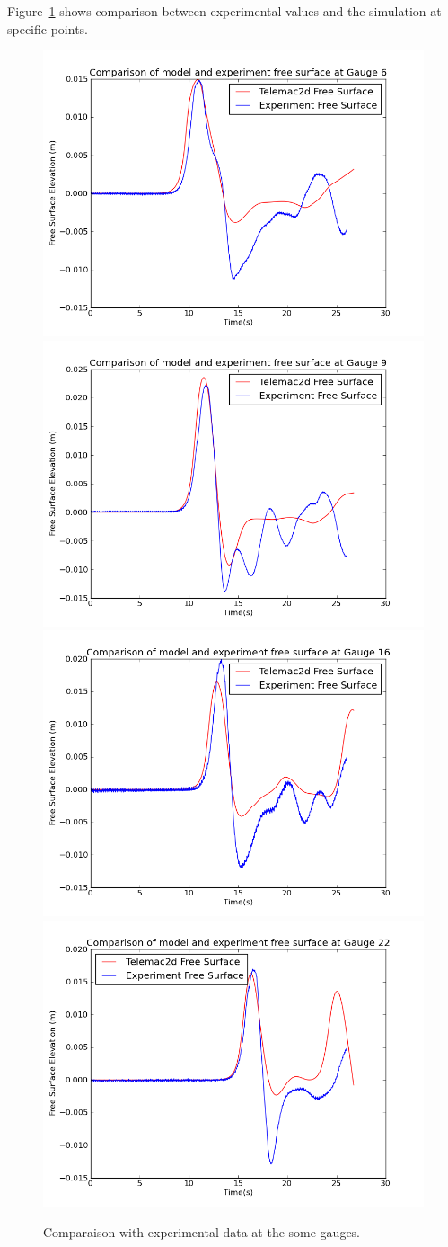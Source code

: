 Figure~\ref{fig:island:res} shows comparison between experimental values and
the simulation at specific points.
\begin{figure}[H]
  \includegraphics[width=.6\textwidth]{img/gauge6.png}
  \includegraphics[width=.6\textwidth]{img/gauge9.png}
  \includegraphics[width=.6\textwidth]{img/gauge16.png}
  \includegraphics[width=.6\textwidth]{img/gauge22.png}
  \caption{Comparaison with experimental data at the some gauges.}\label{fig:island:res}
\end{figure}
